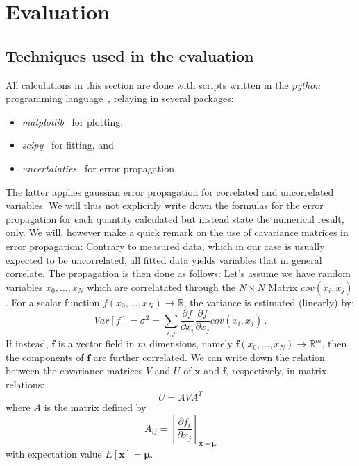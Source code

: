 \newcommand{\figdir}{analysis/figures/}

\section{Evaluation}
\subsection{Techniques used in the evaluation}
All calculations in this section are done with scripts written in 
the \textit{python} programming language~\cite{python}, relaying in several 
packages:
\begin{itemize}
    \item
        \textit{matplotlib}~\cite{Hunter2007} for plotting,
    \item
        \textit{scipy}~\cite{scipy} for fitting, and 
    \item
        \textit{uncertainties}~\cite{uc} for error propagation.
\end{itemize}
The latter applies gaussian error propagation for correlated and uncorrelated variables. 
We will thus not explicitly write down the formulas for the error propagation 
for each quantity calculated but instead state the numerical result, only. 
We will, however make a quick remark on the use of cavariance matrices in 
error propagation: Contrary to measured data, which in our case is usually 
expected to be uncorrelated, all fitted data yields variables that in general correlate. 
The propagation is then done as follows:
Let's assume we have random
variables $x_0,...,x_N$ which are correlatated through the $N\times N$ Matrix $cov(x_i,x_j)$.
For a scalar function $f(x_0,...,x_N) \rightarrow \mathbb{R}$, the variance is estimated (linearly) by:
\begin{equation}
Var[f] = \sigma^2 = \sum_{i,j} \frac{\partial f}{\partial x_i} \frac{\partial f}{\partial x_j} cov(x_i,x_j) \,.
\end{equation} 
If instead, $\mathbf{f}$ is a vector field in $m$ dimensions, namely 
$\mathbf{f}(x_0,...,x_N) \rightarrow \mathbb{R}^m$, then the components of $\mathbf{f}$ 
are further correlated. We can write down the relation between the covariance matrices $V$ and $U$ of 
$\mathbf{x}$ and $\mathbf{f}$, respectively, in matrix relations:
\begin{equation}
    U = A V A^T
\end{equation}
where $A$ is the matrix defined by 
\begin{equation}
    A_{ij} = \left[ \frac{\partial f_i}{\partial x_j}\right]_{\mathbf{x} = \mathbf{\mu}}
\end{equation}
with expectation value $E[\mathbf{x}] = \mathbf{\mu}$.~\cite{cowan1998statistical}

